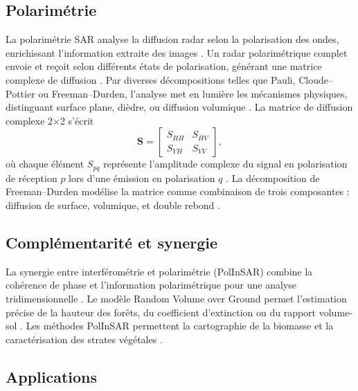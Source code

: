 \subsection{Polarimétrie}

La polarimétrie SAR analyse la diffusion radar selon la polarisation des ondes, enrichissant l'information extraite des images \cite{lee2009polarimetric, cloude2009polarisation}. Un radar polarimétrique complet envoie et reçoit selon différents états de polarisation, générant une matrice complexe de diffusion \cite{elachi2006remote, lee2009polarimetric}. Par diverses décompositions telles que Pauli, Cloude–Pottier ou Freeman–Durden, l'analyse met en lumière les mécanismes physiques, distinguant surface plane, dièdre, ou diffusion volumique \cite{lee2009polarimetric, cloude1997eigenvalue, freeman1998threescattering}. La matrice de diffusion complexe 2×2 s'écrit
\begin{equation}
\mathbf{S} = \begin{bmatrix}
S_{HH} & S_{HV} \\
S_{VH} & S_{VV}
\end{bmatrix},
\label{eq:matrice_sinclair}
\end{equation}
où chaque élément $S_{pq}$ représente l'amplitude complexe du signal en polarisation de réception $p$ lors d'une émission en polarisation $q$ \cite{lee2009polarimetric}. La décomposition de Freeman–Durden modélise la matrice comme combinaison de trois composantes : diffusion de surface, volumique, et double rebond \cite{freeman1998threescattering, lee2009polarimetric}.

\subsection{Complémentarité et synergie}

La synergie entre interférométrie et polarimétrie (PolInSAR) combine la cohérence de phase et l'information polarimétrique pour une analyse tridimensionnelle \cite{cloude1998polarimetric, papathanassiou2001single}. Le modèle Random Volume over Ground permet l'estimation précise de la hauteur des forêts, du coefficient d'extinction ou du rapport volume-sol \cite{cloude1998polarimetric, papathanassiou2001single}. Les méthodes PolInSAR permettent la cartographie de la biomasse et la caractérisation des strates végétales \cite{lee2009polarimetric}.

\subsection{Applications}


